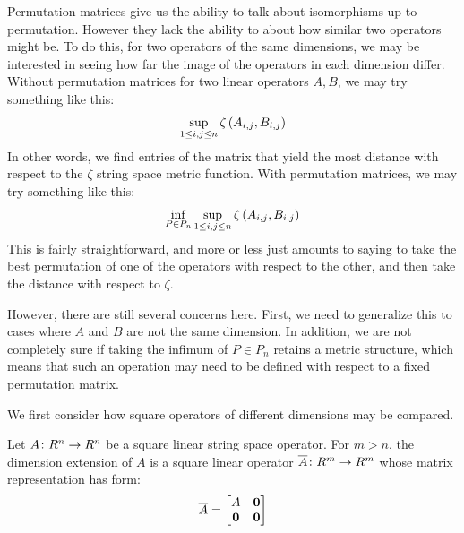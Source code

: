 \documentclass[12pt]{article}
\begin{document}
Permutation matrices give us the ability to talk about
isomorphisms up to permutation.
However they lack the ability to about how similar two operators might be.
To do this, for two operators of the same dimensions,
we may be interested in seeing how far the image of the operators
in each dimension differ.
Without permutation matrices
for two linear operators \(A, B\), we may try something like this:
\begin{align*}
  \sup_{1 \leq i, j \leq n}
    \zeta\left(A_{i, j}, B_{i, j}\right)
\end{align*}
In other words, we find entries of the matrix that yield the most distance
with respect to the \(\zeta\) string space metric function.
With permutation matrices, we may try something like this:
\begin{align*}
  \inf_{P \in P_n} \sup_{1 \leq i, j \leq n}
    \zeta\left(A_{i, j}, B_{i, j}\right)
\end{align*}
This is fairly straightforward, and more or less just amounts to saying
to take the best permutation of one of the operators with respect
to the other, and then take the distance with respect to
\(\zeta\).

However, there are still several concerns here.
First, we need to generalize this to cases where
\(A\) and \(B\) are not the same dimension.
In addition, we are not completely sure if taking the infimum of
\(P \in P_n\) retains a metric structure,
which means that such an operation may need to be defined with respect
to a fixed permutation matrix.

We first consider how square operators of different dimensions may be compared.

\begin{definition}
  Let \(A \colon R^n \to R^n\) be a square linear string space operator.
  For \(m > n\),
  the dimension extension of \(A\)
  is a square linear operator \(\overline{A} \colon R^m \to R^m\)
  whose matrix representation has form:
  \begin{align*}
    \overline{A} = \begin{bmatrix} A & \mathbf{0} \\ \mathbf{0} & \mathbf{0} \end{bmatrix}
  \end{align*}
\end{definition}
\end{document}
